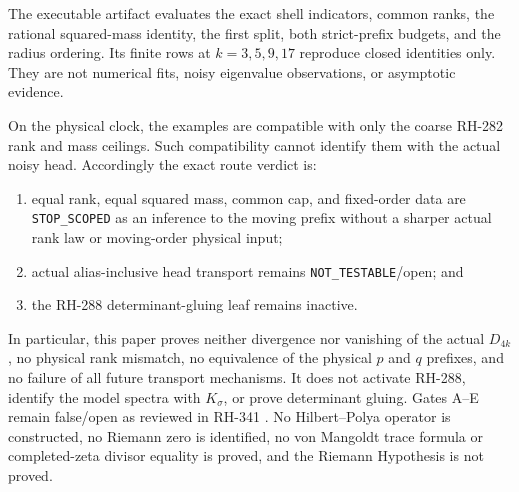 \documentclass[11pt]{article}
\theoremstyle{remark}
\begin{document}
The executable artifact evaluates the exact shell indicators, common ranks,
the rational squared-mass identity, the first split, both strict-prefix
budgets, and the radius ordering.  Its finite rows at $k=3,5,9,17$ reproduce
closed identities only.  They are not numerical fits, noisy eigenvalue
observations, or asymptotic evidence.

On the physical clock, the examples are compatible with only the coarse
RH-282 rank and mass ceilings.  Such compatibility cannot identify them with
the actual noisy head.  Accordingly the exact route verdict is:
\begin{enumerate}
\item equal rank, equal squared mass, common cap, and fixed-order data are
\texttt{STOP\_SCOPED} as an inference to the moving prefix without a sharper
actual rank law or moving-order physical input;
\item actual alias-inclusive head transport remains
\texttt{NOT\_TESTABLE}/open; and
\item the RH-288 determinant-gluing leaf remains inactive.
\end{enumerate}

In particular, this paper proves neither divergence nor vanishing of the
actual $D_{4k}$, no physical rank mismatch, no equivalence of the physical
$p$ and $q$ prefixes, and no failure of all future transport mechanisms.  It
does not activate RH-288, identify the model spectra with $K_\sigma$, or
prove determinant gluing.  Gates A--E remain false/open as reviewed in
RH-341 \citep{WangActualFrontier2026}.  No Hilbert--Polya operator is
constructed, no Riemann zero is identified, no von Mangoldt trace formula or
completed-zeta divisor equality is proved, and the Riemann Hypothesis is not
proved.



\end{document}
